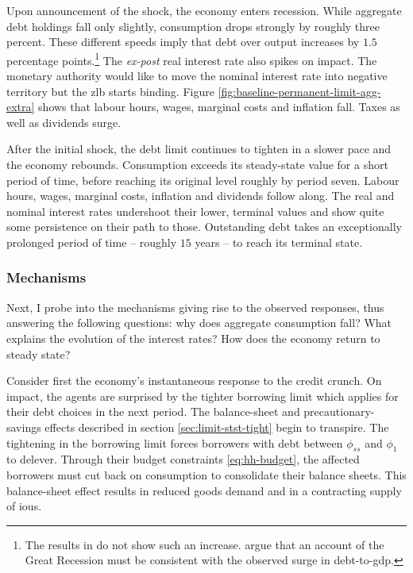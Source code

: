 \documentclass[a4paper,12pt]{article} %
\numberwithin{equation}{section} %
\numberwithin{figure}{section}
\numberwithin{table}{section}
\begin{document}
Upon announcement of the shock, the economy enters recession. While aggregate debt holdings fall only slightly, consumption drops strongly by roughly three percent. These different speeds imply that debt over output increases by $1.5$ percentage points.\footnote{The results in \textcite{gl2017} do not show such an increase. \textcite{justiniano2015} argue that an account of the Great Recession must be consistent with the observed surge in debt-to-\Gls{gdp}.} The \textit{ex-post} real interest rate also spikes on impact. The monetary authority would like to move the nominal interest rate into negative territory but the \Gls{zlb} starts binding. Figure \ref{fig:baseline-permanent-limit-agg-extra} shows that labour hours, wages, marginal costs and inflation fall. Taxes as well as dividends surge.

After the initial shock, the debt limit continues to tighten in a slower pace and the economy rebounds. Consumption exceeds its steady-state value for a short period of time, before reaching its original level roughly by period seven. Labour hours, wages, marginal costs, inflation and dividends follow along. The real and nominal interest rates undershoot their lower, terminal values and show quite some persistence on their path to those. Outstanding debt takes an exceptionally prolonged period of time -- roughly $15$ years -- to reach its terminal state. 

\subsubsection{Mechanisms}
\label{sec:limit-transition-mechanisms}

Next, I probe into the mechanisms giving rise to the observed responses, thus answering the following questions: why does aggregate consumption fall? What explains the evolution of the interest rates? How does the economy return to steady state?

Consider first the economy's instantaneous response to the credit crunch. On impact, the agents are surprised by the tighter borrowing limit which applies for their debt choices in the next period. The balance-sheet and precautionary-savings effects described in section \ref{sec:limit-stst-tight} begin to transpire. The tightening in the borrowing limit forces borrowers with debt between $\phi_{ss}$ and $\phi_1$ to delever. Through their budget constraints \eqref{eq:hh-budget}, the affected borrowers must cut back on consumption to consolidate their balance sheets. This balance-sheet effect results in reduced goods demand and in a contracting supply of \Gls{iou}s.
\end{document}
